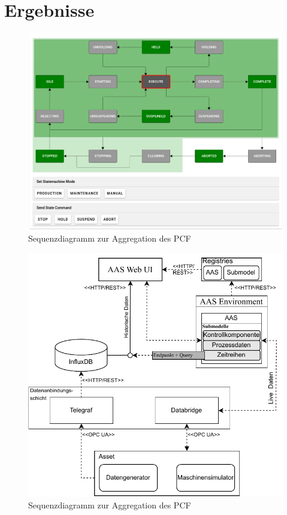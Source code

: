 \section{Ergebnisse}
\newpage
\begin{figure}[htbp]
    \centering
        \includegraphics[width=1\textwidth]{Bilder/Ergebnisse/2025-07-23_15-06.png}
    
    \caption{Sequenzdiagramm zur Aggregation des PCF}
    \label{fig:SequenzdiagrammPCF}
\end{figure}

\begin{figure}[htbp]
    \centering
        \includegraphics[width=1\textwidth]{Bilder/Ergebnisse/DynamischeDaten/Architektur.pdf}
    
    \caption{Sequenzdiagramm zur Aggregation des PCF}
    \label{fig:SequenzdiagrammPCF}
\end{figure}

